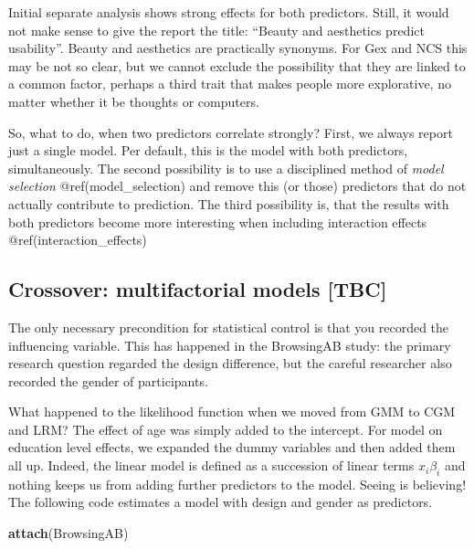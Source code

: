\documentclass[]{svmono}
\newenvironment{Shaded}{\begin{snugshade}}{\end{snugshade}}
\newcommand{\KeywordTok}[1]{\textcolor[rgb]{0.13,0.29,0.53}{\textbf{#1}}}
\newcommand{\DataTypeTok}[1]{\textcolor[rgb]{0.13,0.29,0.53}{#1}}
\newcommand{\DecValTok}[1]{\textcolor[rgb]{0.00,0.00,0.81}{#1}}
\newcommand{\StringTok}[1]{\textcolor[rgb]{0.31,0.60,0.02}{#1}}
\newcommand{\OperatorTok}[1]{\textcolor[rgb]{0.81,0.36,0.00}{\textbf{#1}}}
\newcommand{\NormalTok}[1]{#1}
\theoremstyle{definition}
\theoremstyle{definition}
\theoremstyle{definition}
\theoremstyle{remark}
\begin{document}
Initial separate analysis shows strong effects for both predictors.
Still, it would not make sense to give the report the title: ``Beauty
and aesthetics predict usability''. Beauty and aesthetics are
practically synonyms. For Gex and NCS this may be not so clear, but we
cannot exclude the possibility that they are linked to a common factor,
perhaps a third trait that makes people more explorative, no matter
whether it be thoughts or computers.

So, what to do, when two predictors correlate strongly? First, we always
report just a single model. Per default, this is the model with both
predictors, simultaneously. The second possibility is to use a
disciplined method of \emph{model selection} @ref(model\_selection) and
remove this (or those) predictors that do not actually contribute to
prediction. The third possibility is, that the results with both
predictors become more interesting when including interaction effects
@ref(interaction\_effects)

\subsection{Crossover: multifactorial models
{[}TBC{]}}\label{crossover-multifactorial-models-tbc}

The only necessary precondition for statistical control is that you
recorded the influencing variable. This has happened in the BrowsingAB
study: the primary research question regarded the design difference, but
the careful researcher also recorded the gender of participants.

What happened to the likelihood function when we moved from GMM to CGM
and LRM? The effect of age was simply added to the intercept. For model
on education level effects, we expanded the dummy variables and then
added them all up. Indeed, the linear model is defined as a succession
of linear terms \(x_i\beta_i\) and nothing keeps us from adding further
predictors to the model. Seeing is believing! The following code
estimates a model with design and gender as predictors.

\begin{Shaded}
\begin{Highlighting}[]
\KeywordTok{attach}\NormalTok{(BrowsingAB)}
\end{Highlighting}
\end{Shaded}

\begin{Shaded}
\end{Shaded}
\end{document}
